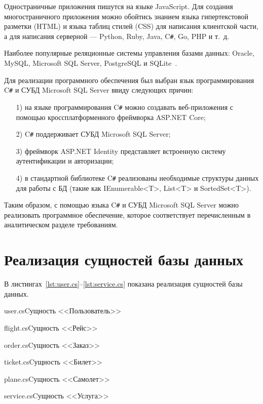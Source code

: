 \documentclass{bmstu}
\begin{document}
Одностраничные приложения пишутся на языке JavaScript. 
Для создания многостраничного приложения можно обойтись знанием языка гипертекстовой разметки (HTML) и языка таблиц стилей (CSS) для написания клиентской части, а для написания серверной --- Python, Ruby, Java, C\texttt{\#}, Go, PHP и т.~д.~\cite{Bekasov2023}

Наиболее популярные реляционные системы управления базами данных: Oracle, MySQL, Microsoft SQL Server, PostgreSQL и SQLite~\cite{Statistics1}\cite{Statistics2}.

Для реализации программного обеспечения был выбран язык программирования C\texttt{\#} и СУБД Microsoft SQL Server ввиду следующих причин:

\begin{enumerate}
\item[1)] на языке программирования C\texttt{\#} можно создавать веб-приложения с помощью кроссплатформенного фреймворка ASP.NET Core;
\item[2)] C\texttt{\#} поддерживает СУБД Microsoft SQL Server;
\item[3)] фреймворк ASP.NET Identity представляет встроенную систему аутентификации и авторизации;
\item[4)] в стандартной библиотеке C\texttt{\#} реализованы необходимые структуры данных для работы с БД (такие как IEnumerable<T>, List<T> и SortedSet<T>).
\end{enumerate}

Таким образом, с помощью языка C\texttt{\#} и СУБД Microsoft SQL Server можно реализовать программное обеспечение, которое соответствует перечисленным в аналитическом разделе требованиям.

\section{Реализация сущностей базы данных}

В листингах~\ref{lst:user.cs}--\ref{lst:service.cs} показана реализация сущностей базы данных.

{user.cs}{Cущность <<Пользователь>>}

{flight.cs}{Cущность <<Рейс>>}

\pagebreak
{}
{order.cs}{Cущность <<Заказ>>}

{ticket.cs}{Cущность <<Билет>>}

{plane.cs}{Cущность <<Самолет>>}

\pagebreak
{}
{service.cs}{Cущность <<Услуга>>}
\end{document}
